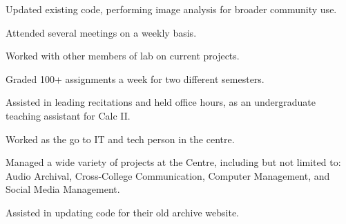 \documentclass[letterpaper]{deedy-resume} %
\begin{document}
\begin{minipage}[t]{0.66\textwidth}

\begin{tightitemize}
\item Updated existing code, performing image analysis for broader community use.
\item Attended several meetings on a weekly basis.
\item Worked with other members of lab on current projects.
\end{tightitemize}

\sectionspace %



\begin{tightitemize}
\item Graded 100+ assignments a week for two different semesters.
\end{tightitemize}

\sectionspace %



\begin{tightitemize}
\item Assisted in leading recitations and held office hours, as an undergraduate teaching assistant for Calc II.
\end{tightitemize}

\sectionspace %



\begin{tightitemize}
\item Worked as the go to IT and tech person in the centre.
\item Managed a wide variety of projects at the Centre, including but not limited to: Audio Archival, Cross-College Communication, Computer Management, and Social Media Management.
\item Assisted in updating code for their old archive website.
\end{tightitemize}


\end{minipage}
\end{document}

